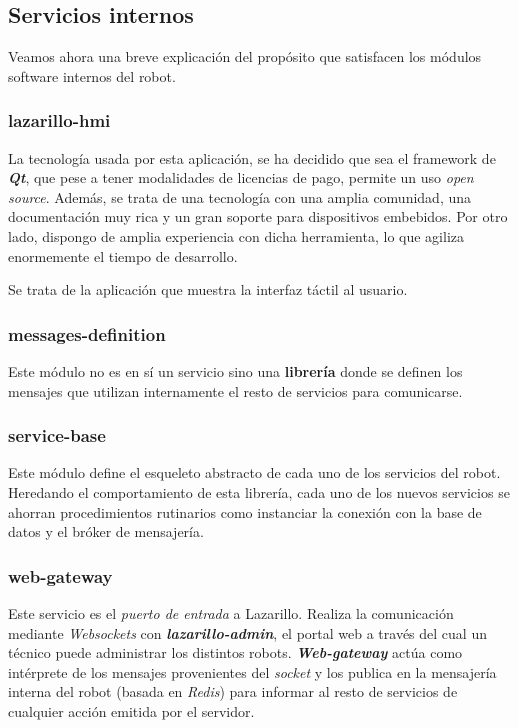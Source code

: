 \subsection{Servicios internos}

Veamos ahora una breve explicación del propósito que satisfacen los módulos software internos del robot.

\subsubsection{lazarillo-hmi}

La tecnología usada por esta aplicación, se ha decidido que sea el framework de \textbf{\textit{Qt}}, que pese a tener modalidades de licencias de pago, permite un uso \textit{open source}. Además, se trata de una tecnología con una amplia comunidad, una documentación muy rica y un gran soporte para dispositivos embebidos. Por otro lado, dispongo de amplia experiencia con dicha herramienta, lo que agiliza enormemente el tiempo de desarrollo.

Se trata de la aplicación que muestra la interfaz táctil al usuario.

\subsubsection{messages-definition}

Este módulo no es en sí un servicio sino una \textbf{librería} donde se definen los mensajes que utilizan internamente el resto de servicios para comunicarse.

\subsubsection{service-base}

Este módulo define el esqueleto abstracto de cada uno de los servicios del robot. Heredando el comportamiento de esta librería, cada uno de los nuevos servicios se ahorran procedimientos rutinarios como instanciar la conexión con la base de datos y el bróker de mensajería.

\subsubsection{web-gateway}

Este servicio es el \textit{puerto de entrada} a Lazarillo. Realiza la comunicación mediante \textit{Websockets} con \textbf{\textit{lazarillo-admin}}, el portal web a través del cual un técnico puede administrar los distintos robots. \textit{\textbf{Web-gateway}} actúa como intérprete de los mensajes provenientes del \textit{socket} y los publica en la mensajería interna del robot (basada en \textit{Redis}) para informar al resto de servicios de cualquier acción emitida por el servidor.


